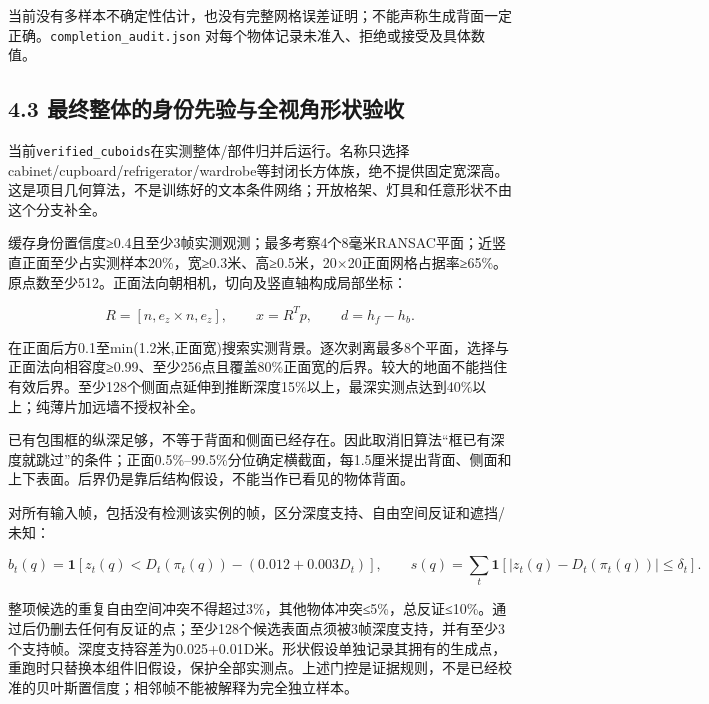 \documentclass[UTF8,fontset=fandol]{ctexart}
\begin{document}
当前没有多样本不确定性估计，也没有完整网格误差证明；不能声称生成背面一定正确。\texttt{completion\_\allowbreak{}audit.\allowbreak{}json} 对每个物体记录未准入、拒绝或接受及具体数值。



\subsection*{4.3 最终整体的身份先验与全视角形状验收}

当前\texttt{verified\_\allowbreak{}cuboids}在实测整体/部件归并后运行。名称只选择cabinet/cupboard/refrigerator/wardrobe等封闭长方体族，绝不提供固定宽深高。这是项目几何算法，不是训练好的文本条件网络；开放格架、灯具和任意形状不由这个分支补全。



缓存身份置信度≥0.4且至少3帧实测观测；最多考察4个8毫米RANSAC平面；近竖直正面至少占实测样本20\%，宽≥0.3米、高≥0.5米，20×20正面网格占据率≥65\%。原点数至少512。正面法向朝相机，切向及竖直轴构成局部坐标：



\[
R=[n,e_z\times n,e_z],\qquad x=R^Tp,\qquad d=h_f-h_b.
\]

在正面后方0.1至min(1.2米,正面宽)搜索实测背景。逐次剥离最多8个平面，选择与正面法向相容度≥0.99、至少256点且覆盖80\%正面宽的后界。较大的地面不能挡住有效后界。至少128个侧面点延伸到推断深度15\%以上，最深实测点达到40\%以上；纯薄片加远墙不授权补全。



已有包围框的纵深足够，不等于背面和侧面已经存在。因此取消旧算法“框已有深度就跳过”的条件；正面0.5\%–99.5\%分位确定横截面，每1.5厘米提出背面、侧面和上下表面。后界仍是靠后结构假设，不能当作已看见的物体背面。



对所有输入帧，包括没有检测该实例的帧，区分深度支持、自由空间反证和遮挡/未知：



\[
b_t(q)=\mathbf1[z_t(q)<D_t(\pi_t(q))-(0.012+0.003D_t)],\qquad
s(q)=\sum_t\mathbf1[|z_t(q)-D_t(\pi_t(q))|\le\delta_t].
\]

整项候选的重复自由空间冲突不得超过3\%，其他物体冲突≤5\%，总反证≤10\%。通过后仍删去任何有反证的点；至少128个候选表面点须被3帧深度支持，并有至少3个支持帧。深度支持容差为0.025+0.01D米。形状假设单独记录其拥有的生成点，重跑时只替换本组件旧假设，保护全部实测点。上述门控是证据规则，不是已经校准的贝叶斯置信度；相邻帧不能被解释为完全独立样本。
\end{document}
